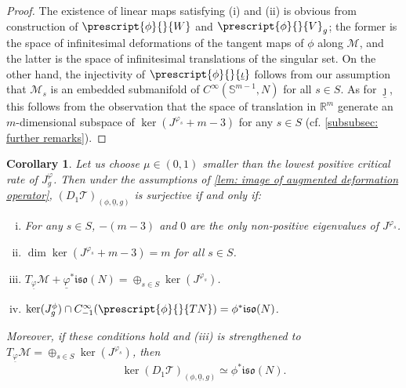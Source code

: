 \documentclass{article}
\numberwithin{equation}{section}        %
\theoremstyle{bfnote}
\newtheorem{cor}[thm]{Corollary}            %
\theoremstyle{definition}
\theoremstyle{bfremark}
\newcommand{\R}{\mathbb{R}}                 %
\newcommand{\Sp}{\mathbb{S}}                %
\begin{document}
\begin{proof}
    The existence of linear maps satisfying (i) and (ii) is obvious from construction of $\prescript{\phi}{}{W}$ and $\prescript{\phi}{}{V}_{g}$; the former is the space of infinitesimal deformations of the tangent maps of $\phi$ along $\mathcal{M}$, and the latter is the space of infinitesimal translations of the singular set. On the other hand, the injectivity of $\prescript{\phi}{}{\underline{\iota}}$ follows from our assumption that $\mathcal{M}_s$ is an embedded submanifold of $C^\infty(\Sp^{m-1},N)$ for all $s \in S$. As for $\underline{\jmath}$, this follows from the observation that the space of translation in $\R^m$ generate an $m$-dimensional subspace of $\ker(J^{\varphi_s}+m-3)$ for any $s \in S$ (cf. \cref{subsubsec: further remarks}).
\end{proof}

\begin{cor}     \label{cor: surjectivity of derivative}
    Let us choose $\mu \in (0,1)$ smaller than the lowest positive critical rate of $J^\varphi_g$. Then under the assumptions of \cref{lem: image of augmented deformation operator}, $(D_1 \mathcal{T})_{(\phi,\underline{0},g)}$ is surjective if and only if:
    \begin{enumerate}[(i)]
        \item For any $s \in S$, $-(m-3)$ and $0$ are the only non-positive eigenvalues of $J^{\varphi_s}$.
        \item $\dim \ker(J^{\varphi_s}+m-3) = m$ for all $s \in S$.
        \item $T_{\underline{\varphi}} \mathcal{M} + \underline{\varphi}^* \mathfrak{iso}(N) = \oplus_{s \in S} \ker(J^{\varphi_s})$.
        \item $\ker(J^\phi_g) \cap C^\infty_{-1}(\prescript{\phi}{}{TN}) = \phi^* \mathfrak{iso}(N)$.
    \end{enumerate}
    Moreover, if these conditions hold and (iii) is strengthened to $T_{\underline{\varphi}} \mathcal{M} = \oplus_{s \in S} \ker(J^{\varphi_s})$, then 
    \begin{equation*}
        \ker (D_1 \mathcal{T})_{(\phi,\underline{0},g)} \simeq \phi^* \mathfrak{iso}(N) .
    \end{equation*}
\end{cor}
\end{document}
